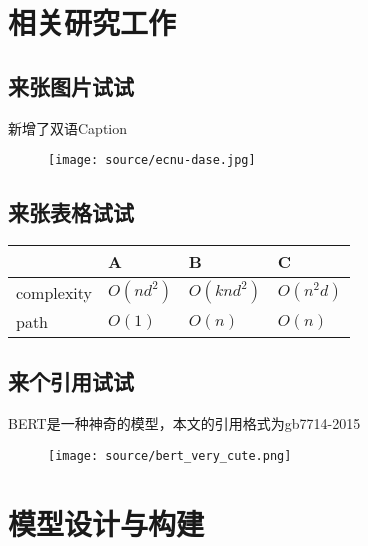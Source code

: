 \documentclass{ecnuthesis}
\begin{document}
\chapter{相关研究工作}

\section{来张图片试试}


新增了双语Caption

\begin{figure}[H]
    \centering
    \texttt{[image: source/ecnu-dase.jpg]}
\end{figure}


\section{来张表格试试}

\begin{table}[h]
\centering
\begin{tabular}{llll} 
  & A & B & C \\
  \hline complexity & $O(nd^{2})$ & $O({knd^{2}})$ & $O(n^{2}d)$ \\
  \hline path & $O(1)$ & $O(n)$ & $O(n)$ \\
\end{tabular}
  \label{tab:my_label}
\end{table}

\section{来个引用试试}

BERT\cite{devlin-etal-2019-bert}是一种神奇的模型，本文的引用格式为gb7714-2015

\begin{figure}[H]
    \centering
    \texttt{[image: source/bert\_very\_cute.png]}
\end{figure}

\chapter{模型设计与构建}
\end{document}
